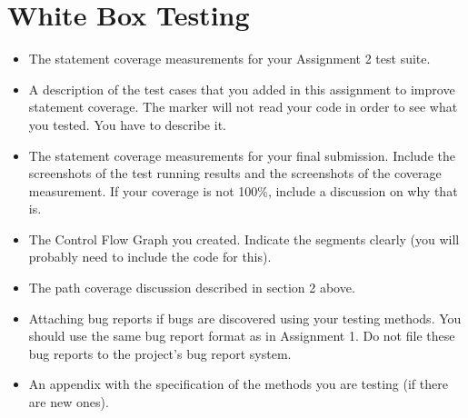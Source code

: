 \documentclass[fontsize=12pt,paper=letter,twoside]{scrartcl}
\begin{document}
\newpage
\section{White Box Testing}

\begin{itemize}
\item The statement coverage measurements for your Assignment 2 test suite.
\item A description of the test cases that you added in this assignment to improve statement
coverage. The marker will not read your code in order to see what you tested. You have to
describe it.
\item The statement coverage measurements for your final submission. Include the screenshots of
the test running results and the screenshots of the coverage measurement. If your coverage is
not 100\%, include a discussion on why that is.
\item The Control Flow Graph you created. Indicate the segments clearly (you will probably need
to include the code for this).
\item The path coverage discussion described in section 2 above.
\item Attaching bug reports if bugs are discovered using your testing methods. You should use the
same bug report format as in Assignment 1. Do not file these bug reports to the project’s bug
report system.
\item An appendix with the specification of the methods you are testing (if there are new ones). 
\end{itemize}
\end{document}
